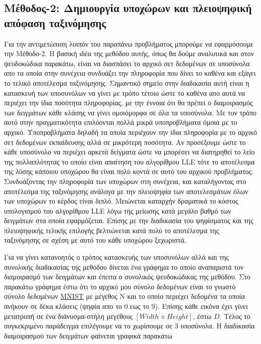 \subsection{Μέθοδος-2: Δημιουργία υποχώρων και πλειοψηφική απόφαση ταξινόμησης }
\par
Για την αντιμετώπιση λοιπόν του παραπάνω προβλήματος μπορούμε να εφαρμόσουμε την Μέθοδο-2. Η βασική ιδέα της μεθόδου αυτής, όπως θα δούμε αναλυτικά και στον ψευδοκώδικα παρακάτω, είναι να διασπάσει το αρχικό σετ δεδομένων σε υποσύνολα απο τα οποία στην συνέχεια συνδυάζει την πληροφορία που δίνει το καθένα και εξάγει το τελικό αποτέλεσμα ταξινόμησης. Σημαντικό σημείο στην διαδικασία αυτή είναι η κατασκευή των υποσυνόλων να γίνει με τρόπο τέτοιο ώστε το καθένα απο αυτά να περιέχει την ίδια ποσότητα πληροφορίας, με την έννοια ότι θα πρέπει ο διαμοιρασμός των δειγμάτων κάθε κλάσης να γίνει ομοιόμορφα σε όλα τα υποσύνολα. Με τον τρόπο αυτό στην πραγματικότητα επιλύονται πολλά μικρά υποπροβλήματα όμοια με το αρχικό. Υποπροβλήματα δηλαδή τα οποία περιέχουν την ίδια πληροφορία με το αρχικό σετ δεδομένων εκπαίδευσης αλλά σε μικρότερη ποσότητα. Αν προσέξουμε ώστε το κάθε υποσύνολο να περιέχει αρκετά δείγματα ώστε να μπορέσει να διατηρηθεί το λείο της πολλαπλότητας το οποίο είναι απαίτηση του αλγορίθμου \textlatin{LLE} τότε το αποτέλεσμα της λύσης κάποιου υποχώρου θα είναι πολύ κοντά σε αυτό του αρχικού προβλήματος. Συνδυάζοντας την πληροφορία των υποχώρων στη συνέχεια, και καταλήγοντας στο αποτέλεσμα της ταξινόμησης ανάλογα με την πλειοψηφία των αποτελεσμάτων όλων των υποχώρων το κέρδος είναι διπλό. Μειώνεται καταρχήν δραματικά το κόστος υπολογισμού του αλγορίθμου \textlatin{LLE} λόγω της μείωσης κατά μεγάλο βαθμό των δειγμάτων στα οποία εφαρμόζεται. Επίσης με την διαδικασία του ψηφίσματος και της πλειοψηφικής τελικής επιλογής βελτιώνεται κατά πολύ το αποτέλεσμα της ταξινόμησης σε σχέση με αυτό του κάθε υποχώρου ξεχωριστά. 
\par
Για να γίνει κατανοητός ο τρόπος κατασκευής των υποσυνόλων αλλά και της συνολικής διαδικασίας της μεθόδου δίνεται ένα γράφημα το οποίο αναπαριστά τον διαμοιρασμό των δειγμάτων και έπειτα ο συνολικός ψευδοκώδικας της μεθόδου. Στο παρακάτω γράφημα έστω ότι το αρχικό μου σύνολο δεδομένων είναι το γνωστό σύνολο δεδομένων \href{http://yann.lecun.com/exdb/mnist/}{\textlatin{MNIST}} με μέγεθος \textlatin{N} και το οποίο περιέχει δεδομένα τα οποία ανήκουν σε δέκα κλάσεις (ψηφία απο το 0 εως το 9). Επίσης κάθε εικόνα έχει γίνει μετατροπή σε ένα διάνυσμα-στήλη μεγέθους $[Width \times Height]$, έστω $D$. Τέλος το συγκεκριμένο παράδειγμα επιλέγουμε να το χωρίσουμε σε 3 υποσύνολα. Η διαδικασία διαμοιρασμού των δειγμάτων φαίνεται γραφικά παρακάτω
